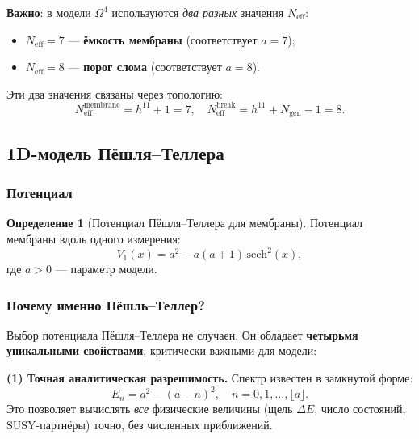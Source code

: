 \documentclass[11pt,a4paper]{article}
\newcommand{\Om}{\ensuremath{\Omega^4}}
\theoremstyle{definition}
\newtheorem{definition}[theorem]{Определение}
\begin{document}
\medskip\noindent
\textbf{Важно}: в модели $\Om$ используются \emph{два разных}
значения $N_{\text{eff}}$:
\begin{itemize}
    \item $N_{\text{eff}} = 7$ --- \textbf{ёмкость мембраны}
          (соответствует $a = 7$);
    \item $N_{\text{eff}} = 8$ --- \textbf{порог слома}
          (соответствует $a = 8$).
\end{itemize}
Эти два значения связаны через топологию:
\begin{equation}
    N_{\text{eff}}^{\text{membrane}} = h^{11} + 1 = 7, \quad
    N_{\text{eff}}^{\text{break}} = h^{11} + N_{\text{gen}} - 1 = 8.
\end{equation}

\subsection{1D-модель Пёшля--Теллера}
\label{subsec:membrane-1D}

\subsubsection{Потенциал}

\begin{definition}[Потенциал Пёшля--Теллера для мембраны]
\label{def:membrane-pt}
Потенциал мембраны вдоль одного измерения:
\begin{equation}
    \boxed{
    V_1(x) = a^2 - a(a+1) \, \mathrm{sech}^2(x),
    }
    \label{eq:membrane-V1}
\end{equation}
где $a > 0$ --- параметр модели.
\end{definition}
\subsubsection{Почему именно Пёшль–Теллер?}
\label{subsubsec:why-poschl-teller}

Выбор потенциала Пёшля–Теллера не случаен. Он обладает 
\textbf{четырьмя уникальными свойствами}, критически важными 
для модели:

\medskip\noindent
\textbf{(1) Точная аналитическая разрешимость.}
Спектр известен в замкнутой форме:
\begin{equation}
    E_n = a^2 - (a-n)^2, \quad n = 0, 1, \ldots, \lfloor a \rfloor.
\end{equation}
Это позволяет вычислять \emph{все} физические величины 
(щель $\Delta E$, число состояний, SUSY-партнёры) точно, 
без численных приближений.
\end{document}
